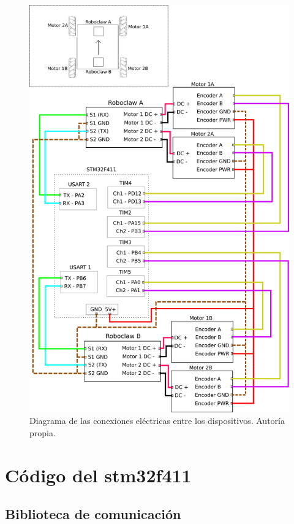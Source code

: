 \begin{figure}[h!]
\centering
\includegraphics[scale=0.63]{imagenes/diagrama_electrico.png}
\caption{Diagrama de las conexiones eléctricas entre los dispositivos. Autoría propia.}
\label{F:conexiones}
\end{figure}

\section{Código del stm32f411}

\subsection{Biblioteca de comunicación}


